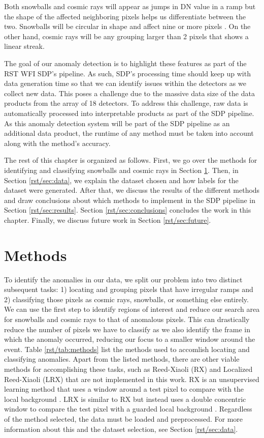 Both snowballs and cosmic rays will appear as jumps in DN value in a ramp but the shape of the affected neighboring pixels helps us differentiate between the two.
Snowballs will be circular in shape and affect nine or more pixels \parencite{cillis2018snowballs}.
On the other hand, cosmic rays will be any grouping larger than 2 pixels that shows a linear streak. 

The goal of our anomaly detection is to highlight these features as part of the RST WFI SDP's pipeline. 
As such, SDP's processing time should keep up with data generation time so that we can identify issues within the detectors as we collect new data. 
This poses a challenge due to the massive data size of the data products from the array of 18 detectors. 
To address this challenge, raw data is automatically processed into interpretable products as part of the SDP pipeline. 
As this anomaly detection system will be part of the SDP pipeline as an additional data product, the runtime of any method must be taken into account along with the method's accuracy. 

The rest of this chapter is organized as follows.
First, we go over the methods for identifying and classifying snowballs and cosmic rays in Section \ref{rst/sec:methods}.
Then, in Section \ref{rst/sec:data}, we explain the dataset chosen and how labels for the dataset were generated.
After that, we discuss the results of the different methods and draw conclusions about which methods to implement in the SDP pipeline in Section \ref{rst/sec:results}.
Section \ref{rst/sec:conclusions} concludes the work in this chapter.
Finally, we discuss future work in Section \ref{rst/sec:future}.

\section{Methods}
\label{rst/sec:methods}
To identify the anomalies in our data, we split our problem into two distinct subsequent tasks: 1) locating and grouping pixels that have irregular ramps and 2) classifying those pixels as cosmic rays, snowballs, or something else entirely.
We can use the first step to identify regions of interest and reduce our search area for snowballs and cosmic rays to that of anomalous pixels.
This can drastically reduce the number of pixels we have to classify as we also identify the frame in which the anomaly occurred, reducing our focus to a smaller window around the event. 
Table \ref{rst/tab:methods} list the methods used to accomlish locating and classifying anomalies.
Apart from the listed methods, there are other viable methods for accomplishing these tasks, such as Reed-Xiaoli (RX) and Localized Reed-Xiaoli (LRX) that are not implemented in this work.
RX is an unsupervised learning method that uses a window around a test pixel to compare with the local background \parencite{reed1990adaptive}.
LRX is similar to RX but instead uses a double concentric window to compare the test pixel with a guarded local background \parencite{molero2013analysis}.
Regardless of the method selected, the data must be loaded and preprocessed.
For more information about this and the dataset selection, see Section \ref{rst/sec:data}.

